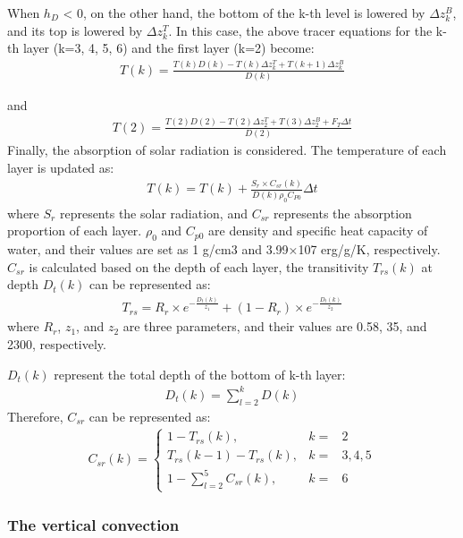 When \(h_{D}\) \textless{} 0, on the other hand, the bottom of the k-th level is lowered by \(\Delta z_{k}^{B}\), and its top is lowered by \(\Delta z_{k}^{T}\). In this case, the above tracer
equations for the k-th layer (k=3, 4, 5, 6) and the first layer (k=2) become: \begin{eqnarray}
T(k)=\frac{T(k)D(k)-T(k)\Delta z_{k}^{T}+T(k+1)\Delta z_{k}^{B}}{D(k)}
\end{eqnarray}

and \begin{eqnarray}
T(2)=\frac{T(2)D(2)-T(2)\Delta z_{2}^{T}+T(3)\Delta z_{2}^{B}+F_{T}\Delta t}{D(2)}
\end{eqnarray} Finally, the absorption of solar radiation is considered. The temperature of each layer is updated as: \begin{eqnarray}
T(k)=T(k)+\frac{S_{r}\times C_{sr}(k)}{D(k)\rho _{0}C_{P0}}\Delta t
\end{eqnarray} where \(S_{r}\) represents the solar radiation, and \(C_{sr}\) represents the absorption proportion of each layer. \(\rho_{0}\) and \(C_{p0}\) are density and specific heat capacity of water, and
their values are set as 1 g/cm3 and 3.99×107 erg/g/K, respectively. \(C_{sr}\) is calculated based on the depth of each layer, the transitivity \(T_{rs}(k)\) at depth \(D_{t}(k)\) can be represented
as: \begin{eqnarray}
T_{rs}=R_{r}\times e^{-\frac{D_{t}(k)}{z_{1}}}+(1-R_{r})\times e^{-\frac{D_{t}(k)}{z_{2}}}
\end{eqnarray} where \(R_{r}\), \(z_{1}\), and \(z_{2}\) are three parameters, and their values are 0.58, 35, and 2300, respectively.

\(D_{t}(k)\) represent the total depth of the bottom of k-th layer: \begin{eqnarray}
D_{t}(k)=\sum_{l=2}^{k}D(k)
\end{eqnarray} Therefore, \(C_{sr}\) can be represented as: \begin{eqnarray}
C_{sr}(k)=\left\{\begin{matrix}
1-T_{rs}(k), &k=&2\\T_{rs}(k-1)-T_{rs}(k), &k=&3, 4, 5
\\ 1-\sum_{l=2}^{5}C_{sr}(k), &k=&6
\end{matrix}\right.
\end{eqnarray}

\subsubsection{The vertical convection}\label{the-vertical-convection}

